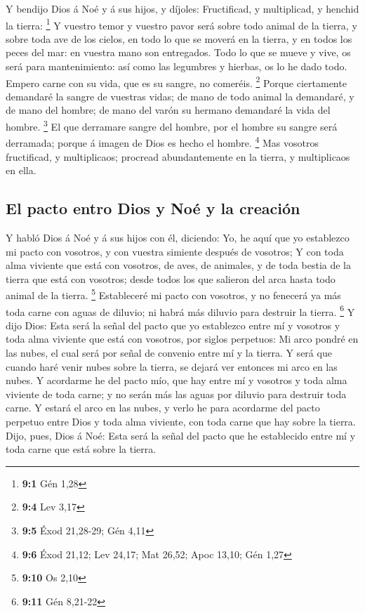  Y bendijo Dios á Noé y á sus hijos, y díjoles:
Fructificad, y multiplicad, y henchid la tierra: \footnote{\textbf{9:1}
  Gén 1,28}  Y vuestro temor y vuestro pavor será sobre
todo animal de la tierra, y sobre toda ave de los cielos, en todo lo que
se moverá en la tierra, y en todos los peces del mar: en vuestra mano
son entregados.  Todo lo que se mueve y vive, os será para
mantenimiento: así como las legumbres y hierbas, os lo he dado todo.
 Empero carne con su vida, que es su sangre, no comeréis.
\footnote{\textbf{9:4} Lev 3,17}  Porque ciertamente
demandaré la sangre de vuestras vidas; de mano de todo animal la
demandaré, y de mano del hombre; de mano del varón su hermano demandaré
la vida del hombre. \footnote{\textbf{9:5} Éxod 21,28-29; Gén 4,11}
 El que derramare sangre del hombre, por el hombre su
sangre será derramada; porque á imagen de Dios es hecho el hombre.
\footnote{\textbf{9:6} Éxod 21,12; Lev 24,17; Mat 26,52; Apoc 13,10; Gén
  1,27}  Mas vosotros fructificad, y multiplicaos;
procread abundantemente en la tierra, y multiplicaos en ella.

\hypertarget{el-pacto-entro-dios-y-nouxe9-y-la-creaciuxf3n}{%
\subsection{El pacto entro Dios y Noé y la
creación}\label{el-pacto-entro-dios-y-nouxe9-y-la-creaciuxf3n}}

 Y habló Dios á Noé y á sus hijos con él, diciendo:
 Yo, he aquí que yo establezco mi pacto con vosotros, y
con vuestra simiente después de vosotros;  Y con toda
alma viviente que está con vosotros, de aves, de animales, y de toda
bestia de la tierra que está con vosotros; desde todos los que salieron
del arca hasta todo animal de la tierra. \footnote{\textbf{9:10} Os 2,10}
 Estableceré mi pacto con vosotros, y no fenecerá ya más
toda carne con aguas de diluvio; ni habrá más diluvio para destruir la
tierra. \footnote{\textbf{9:11} Gén 8,21-22}  Y dijo
Dios: Esta será la señal del pacto que yo establezco entre mí y vosotros
y toda alma viviente que está con vosotros, por siglos perpetuos:
 Mi arco pondré en las nubes, el cual será por señal de
convenio entre mí y la tierra.  Y será que cuando haré
venir nubes sobre la tierra, se dejará ver entonces mi arco en las
nubes.  Y acordarme he del pacto mío, que hay entre mí y
vosotros y toda alma viviente de toda carne; y no serán más las aguas
por diluvio para destruir toda carne.  Y estará el arco
en las nubes, y verlo he para acordarme del pacto perpetuo entre Dios y
toda alma viviente, con toda carne que hay sobre la tierra.
 Dijo, pues, Dios á Noé: Esta será la señal del pacto que
he establecido entre mí y toda carne que está sobre la tierra.

